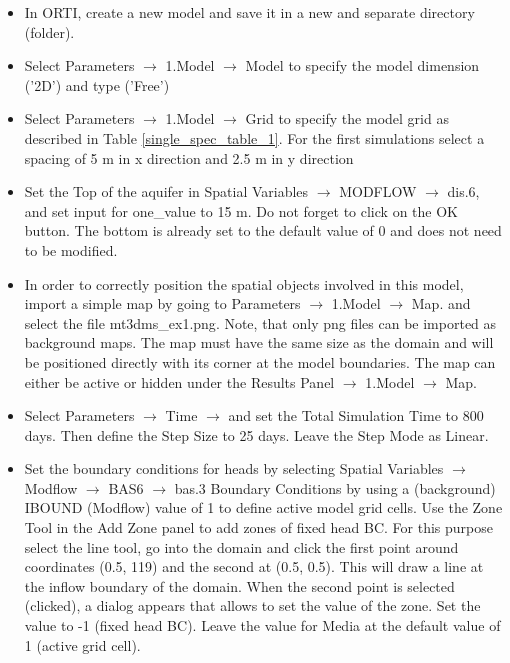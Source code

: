 \begin{itemize}

\item In ORTI, create a new model and save it in a new and separate directory (folder).

\item Select {\color{blue}Parameters} $\rightarrow$ {\color{blue}1.Model} 
$\rightarrow$ {\color{blue}Model} to specify the model dimension {\color{blue}('2D')} and type {\color{blue}('Free')}

\item Select {\color{blue}Parameters} $\rightarrow$ {\color{blue}1.Model} 
$\rightarrow$ {\color{blue}Grid} to specify
the model grid as described in Table \ref{single_spec_table_1}. For the first simulations 
select a spacing of 5 m in x direction and 2.5 m in y direction

\item Set the Top of the aquifer in {\color{blue}Spatial Variables} $\rightarrow$ {\color{blue}MODFLOW} 
$\rightarrow$ {\color{blue}dis.6}, and set input for {\color{blue}one\_value} to 15 m. 
Do not forget to click on the {\color{blue}OK} button. 
The bottom is already set to the default value of 0 and does not need to be modified.

\item In order to correctly position the spatial objects involved in this model, 
import a simple map by going to {\color{blue}Parameters} $\rightarrow$ 
{\color{blue}1.Model} 
$\rightarrow$ 
{\color{blue}Map.} 
and select the file 
{\color{blue}mt3dms\_ex1.png}.
Note, that only png files can be imported as background maps.
The map must have the same size as the domain and will be positioned directly with 
its corner at the model boundaries. The map can either be active or hidden under
the {\color{blue}Results Panel} $\rightarrow$ {\color{blue}1.Model} $\rightarrow$ {\color{blue}Map}.

\item Select {\color{blue}Parameters} $\rightarrow$ {\color{blue}Time} $\rightarrow$ 
and set the  {\color{blue} Total Simulation Time} to 800 days. 
Then define the {\color{blue}Step Size} to 25 days. Leave the {\color{blue}Step Mode} as Linear. 

\item Set the boundary conditions for heads by 
selecting {\color{blue}Spatial Variables} $\rightarrow$ {\color{blue}Modflow} $\rightarrow$ 
{\color{blue}BAS6} $\rightarrow$ {\color{blue}bas.3 Boundary Conditions} by using a (background)
IBOUND (Modflow) value of 1 to define active model grid cells. 
Use the {\color{blue}Zone Tool} in the {\color{blue}Add Zone} panel to add zones 
of fixed head BC. For this purpose select the line tool, go into the domain and click
the first point around coordinates (0.5, 119) and the second at (0.5, 0.5). 
This will draw a line at the inflow boundary of the domain.
When the second point is selected (clicked), a dialog appears that allows to set the 
value of the zone. Set the value to -1 (fixed head BC). 
Leave the value for {\color{blue}Media} at the default value of 1 (active grid cell).


\end{itemize}
